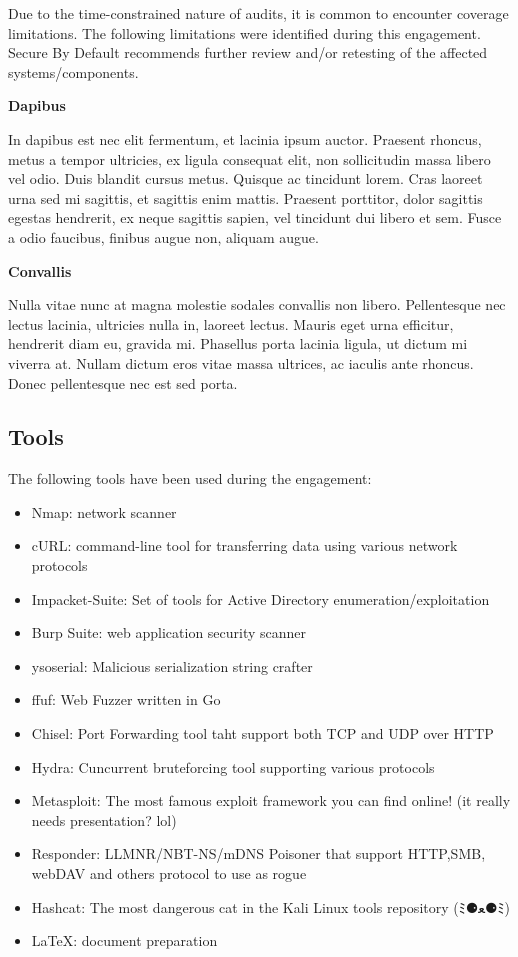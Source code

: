 \documentclass[a4paper]{article}
\def\tightlist{}
\begin{document}
  Due to the time-constrained nature of audits, it is common to encounter coverage limitations.
  The following limitations were identified during this engagement.
  Secure By Default recommends further review and/or retesting of the affected systems/components.

  \textbf{Dapibus}

In dapibus est nec elit fermentum, et lacinia ipsum auctor.
Praesent rhoncus, metus a tempor ultricies, ex ligula consequat elit, non sollicitudin massa libero vel odio.
Duis blandit cursus metus.
Quisque ac tincidunt lorem.
Cras laoreet urna sed mi sagittis, et sagittis enim mattis.
Praesent porttitor, dolor sagittis egestas hendrerit, ex neque sagittis sapien, vel tincidunt dui libero et sem.
Fusce a odio faucibus, finibus augue non, aliquam augue.

\textbf{Convallis}

Nulla vitae nunc at magna molestie sodales convallis non libero.
Pellentesque nec lectus lacinia, ultricies nulla in, laoreet lectus.
Mauris eget urna efficitur, hendrerit diam eu, gravida mi.
Phasellus porta lacinia ligula, ut dictum mi viverra at.
Nullam dictum eros vitae massa ultrices, ac iaculis ante rhoncus.
Donec pellentesque nec est sed porta.


\subsection{Tools}

The following tools have been used during the engagement:

\begin{itemize}
\tightlist
\item
  Nmap: network scanner
\item
  cURL: command-line tool for transferring data using various network protocols
\item
  Impacket-Suite: Set of tools for Active Directory enumeration/exploitation
\item
  Burp Suite: web application security scanner
\item
  ysoserial: Malicious serialization string crafter
\item
  ffuf: Web Fuzzer written in Go
\item
  Chisel: Port Forwarding tool taht support both TCP and UDP over HTTP
\item
  Hydra: Cuncurrent bruteforcing tool supporting various protocols
\item
  Metasploit: The most famous exploit framework you can find online! (it really needs presentation? lol)
\item
  Responder: LLMNR/NBT-NS/mDNS Poisoner that support HTTP,SMB, webDAV and others protocol to use as rogue
\item
  Hashcat: The most dangerous cat in the Kali Linux tools repository (ﾐ⚈ﻌ⚈ﾐ)
\item
  \LaTeX: document preparation
\end{itemize}
\end{document}
